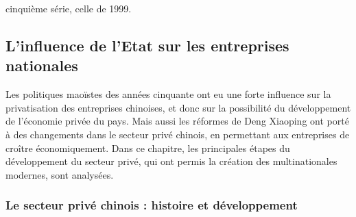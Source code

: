 cinquième série, celle de 1999. 

\subsection{L’influence de l’Etat sur les entreprises nationales}
Les politiques maoïstes des années cinquante ont eu une forte influence sur la privatisation des entreprises chinoises, et donc sur la possibilité du développement de l’économie privée du pays. Mais aussi les réformes de Deng Xiaoping ont porté à des changements dans le secteur privé chinois, en permettant aux entreprises de croître économiquement. Dans ce chapitre, les principales étapes du développement du secteur privé, qui ont permis la création des multinationales modernes, sont analysées.
\subsubsection{Le secteur privé chinois : histoire et développement}
